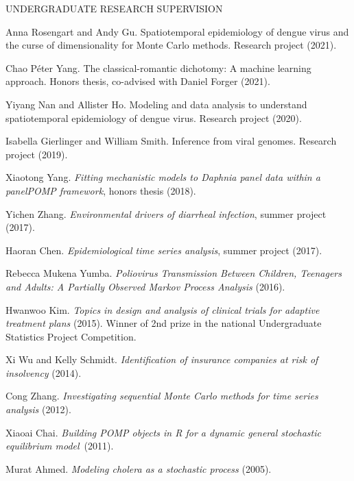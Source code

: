 \begin{reflist}{UNDERGRADUATE RESEARCH SUPERVISION}
\item{Anna Rosengart and Andy Gu}. Spatiotemporal epidemiology of dengue virus and the curse of dimensionality for Monte Carlo methods. Research project (2021).
  \item{Chao P{\'e}ter Yang}. The classical-romantic dichotomy: A machine learning approach. Honors thesis, co-advised with Daniel Forger (2021).
  \item{Yiyang Nan and Allister Ho}. Modeling and data analysis to understand spatiotemporal epidemiology of dengue virus. Research project (2020).
  \item{Isabella Gierlinger and William Smith}. Inference from viral genomes. Research project (2019).
  \item{Xiaotong Yang}. {\em Fitting mechanistic models to Daphnia panel data within a panelPOMP framework}, honors thesis (2018).
\item{Yichen Zhang}. {\em Environmental drivers of diarrheal infection}, summer project (2017).
\item{Haoran Chen}. {\em Epidemiological time series analysis}, summer project (2017).
\item{Rebecca Mukena Yumba}.  {\em Poliovirus Transmission Between Children, Teenagers and Adults: A Partially Observed Markov Process Analysis} (2016).
\item{Hwanwoo Kim}. {\em Topics in design and analysis of clinical trials for adaptive treatment plans} (2015). Winner of 2nd prize in the national Undergraduate Statistics Project Competition.
\item{Xi Wu and Kelly Schmidt}. {\em Identification of insurance companies at risk of insolvency} (2014).
\item{Cong Zhang}. {\em Investigating sequential Monte Carlo methods for time series analysis} (2012).
\item{Xiaoai Chai}. {\em Building POMP objects in R for a dynamic general stochastic equilibrium model}~(2011).  
\item{Murat Ahmed}. {\em Modeling cholera as a stochastic process} (2005).

\end{reflist}



\lsp


